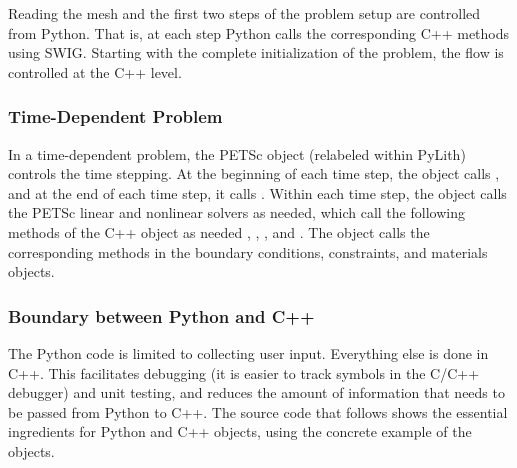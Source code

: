Reading the mesh and the first two steps of the problem setup are
controlled from Python. That is, at each step Python calls the
corresponding C++ methods using SWIG. Starting with the complete
initialization of the problem, the flow is controlled at the C++
level.

\subsubsection{Time-Dependent Problem}

In a time-dependent problem, the PETSc  object (relabeled
 within PyLith) controls the time stepping. At the
beginning of each time step, the  object calls
, and at the end of each
time step, it calls .
Within each time step, the  object calls the PETSc
linear and nonlinear solvers as needed, which call the following
methods of the C++  object as
needed
,
,
, and
.
The  object calls the corresponding methods in the boundary conditions,
constraints, and materials objects.

\subsubsection{Boundary between Python and C++}

The Python code is limited to collecting user input. Everything else
is done in C++. This facilitates debugging (it is easier to track
symbols in the C/C++ debugger) and unit testing, and reduces the
amount of information that needs to be passed from Python to C++. The
source code that follows shows the essential ingredients for Python
and C++ objects, using the concrete example of the 
objects.



